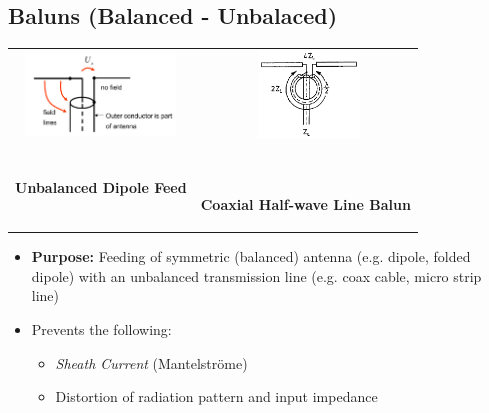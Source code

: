 \subsection{Baluns (Balanced - Unbalaced)}
\begin{tabular}{cc}
    \includegraphics[width=4cm]{content/aawp/pictures/unbalanced_dipole_feed.png} &\
    \includegraphics[width=2.7cm]{content/aawp/pictures/coaxial_half_wave_line_balun.png}\\
    \textbf{Unbalanced Dipole Feed} &\
    \parbox{3cm}{\textbf{Coaxial Half-wave Line Balun}}
\end{tabular}
\begin{itemize}
    \itemsep0pt
    \item \textbf{Purpose:} Feeding of symmetric (balanced) antenna (e.g. dipole, folded dipole) with an unbalanced transmission line (e.g. coax cable, micro strip line)
    \item Prevents the following:
        \begin{itemize}
            \item \textit{Sheath Current} (Mantelströme)
            \item Distortion of radiation pattern and input impedance
        \end{itemize}
\end{itemize}

